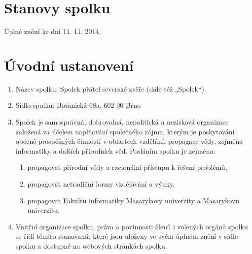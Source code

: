 \documentclass[11pt]{article}
\begin{document}
\section*{Stanovy spolku}

Úplné znění ke dni 11. 11. 2014.

\section{Úvodní ustanovení}
\begin{enumerate}
    \item Název spolku: Spolek přátel severské zvěře (dále též „Spolek“).
    \item Sídlo spolku: Botanická 68a, 602 00 Brno
    \item Spolek je samosprávná, dobrovolná, nepolitická a nezisková organizace 
    založená za účelem naplňování společného zájmu, kterým je poskytování obecně
    prospěšných činností v oblastech vzdělání, propagace vědy, zejména 
    informatiky a dalších přírodních věd. Posláním spolku je zejména: 
    \begin{enumerate}
        \item propagovat přírodní vědy a racionální přístupu k řešení problémů,
        \item propagovat netradiční formy vzdělávání a výuky,
        \item propagovat Fakultu informatiky Masarykovy univerzity a Masarykovu univerzitu.
    \end{enumerate}
    \item Vnitřní organizace spolku, práva a povinnosti členů i volených orgánů 
    spolku se řídí těmito stanovami, které jsou uloženy ve svém úplném znění 
    v sídle spolku a dostupné na webových stránkách spolku.
\end{enumerate}
\end{document}
